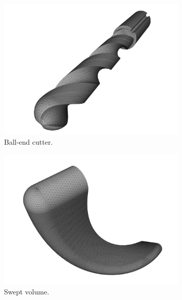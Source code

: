 \begin{figure}[h]
	\centering
		\begin{subfigure}[t]{0.32\textwidth}
			\centering
			\includegraphics[width=\textwidth]{images/hq_impeller_tool}
			\caption{Ball-end cutter.}
			\label{fig:hq_impeller_tool}
		\end{subfigure}
		\begin{subfigure}[t]{0.32\textwidth}
			\centering
			\includegraphics[width=\textwidth]{images/hq_impeller_swept}
			\caption{Swept volume.}
			\label{fig:hq_impeller_swept}
		\end{subfigure}
		\begin{subfigure}[t]{0.32\textwidth}
			\centering

\end{subfigure}
\end{figure}
